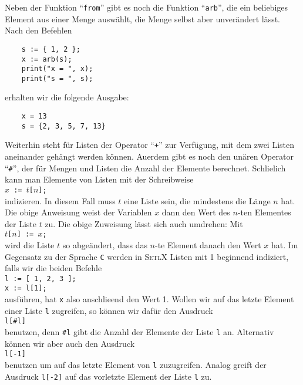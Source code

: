 Neben der Funktion ``\texttt{from}'' gibt es noch die Funktion
``\texttt{arb}'',  die ein beliebiges Element aus einer Menge ausw\"{a}hlt, die Menge selbst
aber unver\"{a}ndert l\"{a}sst.  Nach den Befehlen
\begin{verbatim}
    s := { 1, 2 };
    x := arb(s);
    print("x = ", x);
    print("s = ", s);
\end{verbatim}
erhalten wir die folgende Ausgabe:
\begin{verbatim}
    x = 13
    s = {2, 3, 5, 7, 13}
\end{verbatim}


Weiterhin steht f\"{u}r Listen der Operator ``\texttt{+}''
zur Verf\"{u}gung, mit dem zwei Listen aneinander geh\"{a}ngt werden k\"{o}nnen.
Au\3erdem  gibt es noch den un\"{a}ren Operator ``\texttt{\#}'',
der f\"{u}r Mengen und Listen die Anzahl der Elemente berechnet.
Schlie\3lich kann man Elemente von Listen mit der Schreibweise \\[0.2cm]
\hspace*{1.3cm} \texttt{$x$ := $t$[$n$];} \\[0.2cm]
indizieren.  In diesem Fall muss $t$ eine Liste sein, die mindestens die L\"{a}nge
$n$ hat.  Die obige Anweisung weist der Variablen $x$ dann den Wert des $n$-ten
Elementes der Liste $t$ zu.  Die obige Zuweisung l\"{a}sst sich auch umdrehen: Mit \\[0.2cm]
\hspace*{1.3cm} \texttt{$t$[$n$] := $x$;} \\[0.2cm]
wird die Liste $t$ so abge\"{a}ndert, dass das $n$-te Element danach den Wert $x$ hat.
Im Gegensatz zu der Sprache \texttt{C} werden in \textsc{SetlX} Listen mit 1 beginnend
indiziert, falls wir die beiden Befehle
\\[0.2cm]
\hspace*{1.3cm} \texttt{l := [ 1, 2, 3 ];} \\
\hspace*{1.3cm} \texttt{x := l[1];}
\\[0.2cm]
ausf\"{u}hren, hat \texttt{x} also anschlie\3end den Wert 1.  Wollen wir auf das letzte Element einer
Liste \texttt{l} zugreifen, so k\"{o}nnen wir daf\"{u}r den Ausdruck
\\[0.2cm]
\hspace*{1.3cm}
\texttt{l[\#l]}
\\[0.2cm]
benutzen, denn \texttt{\#l} gibt die Anzahl der Elemente der Liste \texttt{l} an.  Alternativ k\"{o}nnen
wir aber auch den Ausdruck
\\[0.2cm]
\hspace*{1.3cm}
\texttt{l[-1]}
\\[0.2cm]
benutzen um auf das letzte Element von \texttt{l} zuzugreifen.  Analog greift der Ausdruck
\texttt{l[-2]} auf das vorletzte Element der Liste \texttt{l} zu.

